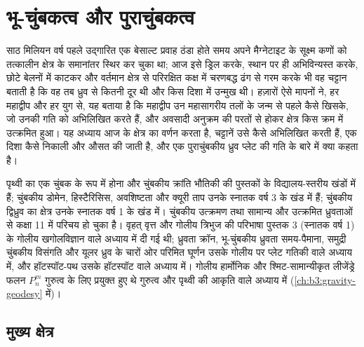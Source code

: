 \chapter{भू-चुंबकत्व और पुराचुंबकत्व}\label{ch:b3:palaeomagnetism}

साठ मिलियन वर्ष पहले उद्गारित एक बेसाल्ट प्रवाह ठंडा होते समय अपने मैग्नेटाइट के सूक्ष्म कणों को
तत्कालीन क्षेत्र के समानांतर स्थिर कर चुका था; आज इसे ड्रिल करके, स्थान पर ही अभिविन्यस्त करके,
छोटे बेलनों में काटकर और वर्तमान क्षेत्र से परिरक्षित कक्ष में चरणबद्ध ढंग से गरम करके भी
वह चट्टान बताती है कि वह तब ध्रुव से कितनी दूर थी
और किस दिशा में उन्मुख थी।
हज़ारों ऐसे मापनों ने, हर महाद्वीप और हर युग से, यह बताया है कि
महाद्वीप उन महासागरीय तलों के जन्म से पहले कैसे खिसके, जो उनकी गति को अभिलिखित करते हैं,
और अवसादी अनुक्रम की परतों से होकर क्षेत्र किस क्रम में उत्क्रमित हुआ।
यह अध्याय आज के क्षेत्र का वर्णन करता है, चट्टानें उसे कैसे अभिलिखित करती हैं,
एक दिशा कैसे निकाली और औसत की जाती है,
और एक पुराचुंबकीय ध्रुव प्लेट की गति के बारे में क्या कहता है।

\begin{recall}
पृथ्वी का एक चुंबक के रूप में होना और चुंबकीय क्रांति भौतिकी की पुस्तकों के
विद्यालय-स्तरीय खंडों में हैं; चुंबकीय डोमेन, हिस्टैरिसिस, अवशिष्टता और
क्यूरी ताप उनके स्नातक वर्ष 3 के खंड में हैं; चुंबकीय द्विध्रुव का क्षेत्र उनके
स्नातक वर्ष 1 के खंड में। चुंबकीय उत्क्रमण तथा सामान्य और उत्क्रमित ध्रुवताओं से
कक्षा 11 में परिचय हो चुका है। वृहत् वृत्त और गोलीय त्रिभुज की परिभाषा
पुस्तक 3 (स्नातक वर्ष 1) के गोलीय खगोलविज्ञान वाले अध्याय में दी गई थी; ध्रुवता क्रॉन,
भू-चुंबकीय ध्रुवता समय-पैमाना, समुद्री चुंबकीय विसंगति और यूलर ध्रुव के चारों ओर
परिमित घूर्णन उसके गोलीय पर प्लेट गतिकी वाले अध्याय में, और
हॉटस्पॉट-पथ उसके हॉटस्पॉट वाले अध्याय में। गोलीय हार्मोनिक और
श्मिट-सामान्यीकृत लीजेंड्रे फलन $P_n^m$ गुरुत्व के लिए प्रयुक्त हुए थे
गुरुत्व और पृथ्वी की आकृति वाले अध्याय में (\cref{ch:b3:gravity-geodesy} में)।
\end{recall}

\section{मुख्य क्षेत्र}


